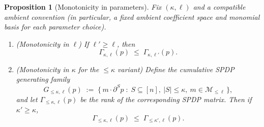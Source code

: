 \documentclass[12pt]{article}
\newtheorem{proposition}[theorem]{Proposition}
\theoremstyle{definition}
\theoremstyle{remark}
\begin{document}
\begin{proposition}[Monotonicity in parameters]
\label{prop:monotonicity-params}
Fix $(\kappa,\ell)$ and a compatible ambient convention (in particular, a fixed
ambient coefficient space and monomial basis for each parameter choice).
\begin{enumerate}
\item[(i)] (\emph{Monotonicity in $\ell$}) If $\ell' \ge \ell$, then
\[
  \Gamma_{\kappa,\ell}(p) \;\le\; \Gamma_{\kappa,\ell'}(p).
\]
\item[(ii)] (\emph{Monotonicity in $\kappa$ for the $\le \kappa$ variant})
Define the cumulative SPDP generating family
\[
  G_{\le \kappa,\ell}(p)
  \;:=\;
  \{\, m\cdot \partial^{S}p \;:\; S\subseteq[n],\ |S|\le \kappa,\ m\in \mathcal{M}_{\le \ell}\,\},
\]
and let $\Gamma_{\le \kappa,\ell}(p)$ be the rank of the corresponding SPDP matrix.
Then if $\kappa'\ge \kappa$,
\[
  \Gamma_{\le \kappa,\ell}(p) \;\le\; \Gamma_{\le \kappa',\ell}(p).
\]
\end{enumerate}
\end{proposition}
\end{document}
